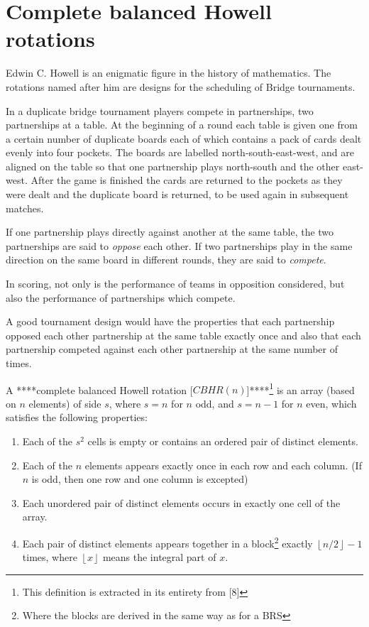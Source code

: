 \documentclass[
  12pt,
  a4paper]{book}
\begin{document}
\hypertarget{complete-balanced-howell-rotations}{%
\section{Complete balanced Howell
rotations}\label{complete-balanced-howell-rotations}}

Edwin C. Howell is an enigmatic figure in the history of mathematics.
The rotations named after him are designs for the scheduling of Bridge
tournaments.

In a duplicate bridge tournament players compete in partnerships, two
partnerships at a table. At the beginning of a round each table is given
one from a certain number of duplicate boards each of which contains a
pack of cards dealt evenly into four pockets. The boards are labelled
north-south-east-west, and are aligned on the table so that one
partnership plays north-south and the other east-west. After the game is
finished the cards are returned to the pockets as they were dealt and
the duplicate board is returned, to be used again in subsequent matches.

If one partnership plays directly against another at the same table, the
two partnerships are said to \emph{oppose} each other. If two
partnerships play in the same direction on the same board in different
rounds, they are said to \emph{compete}.

In scoring, not only is the performance of teams in opposition
considered, but also the performance of partnerships which compete.

A good tournament design would have the properties that each partnership
opposed each other partnership at the same table exactly once and also
that each partnership competed against each other partnership at the
same number of times.

A ****complete balanced Howell rotation {[}\(CBHR(n)\){]}****\footnote{This
  definition is extracted in its entirety from {[}8{]}} is an array
(based on \(n\) elements) of side \(s\), where \(s=n\) for \(n\) odd,
and \(s=n-1\) for \(n\) even, which satisfies the following properties:

\begin{enumerate}
\def\labelenumi{\arabic{enumi}.}
\item
  Each of the \(s^2\) cells is empty or contains an ordered pair of
  distinct elements.
\item
  Each of the \(n\) elements appears exactly once in each row and each
  column. (If \(n\) is odd, then one row and one column is excepted)
\item
  Each unordered pair of distinct elements occurs in exactly one cell of
  the array.
\item
  Each pair of distinct elements appears together in a block\footnote{Where
    the blocks are derived in the same way as for a BRS} exactly
  \(\left \lfloor{n/2}\right \rfloor -1\) times, where
  \(\left \lfloor{x}\right \rfloor\) means the integral part of \(x\).
\end{enumerate}
\end{document}
